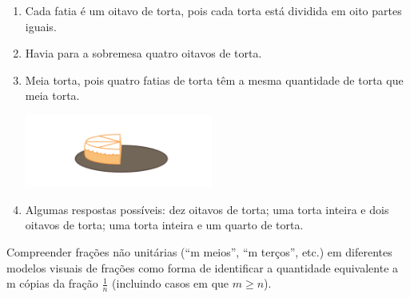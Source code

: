 \begin{multicols}{2}
\begin{orientacoes}{}{}
\end{orientacoes}

\begin{solucao}{}{}
\begin{enumerate} [\quad a)] %
    \item       Cada fatia é um oitavo de torta, pois cada torta está dividida em oito partes iguais.
    \item       Havia para a sobremesa quatro oitavos de torta.
    \item       Meia torta, pois quatro fatias de torta têm a mesma quantidade de torta que meia torta.

  \begin{center}
  \includegraphics[width=175pt, keepaspectratio]{../figuras/licao02/ativ3_resposta.png}
  \end{center}

    \item       Algumas respostas possíveis: dez oitavos de torta;  uma torta inteira e dois oitavos de torta; uma torta inteira e um quarto de torta.
\end{enumerate} %

\end{solucao}


\begin{objetivos}[label=chap2-ativ5]{}{}

  Compreender frações não unitárias (``m meios'', ``m terços'', etc.) em diferentes modelos visuais de frações como forma de identificar a quantidade equivalente a m cópias da fração $\frac{1}{n}$ (incluindo casos em que $m \geq n$).
\end{objetivos}


\end{multicols}
